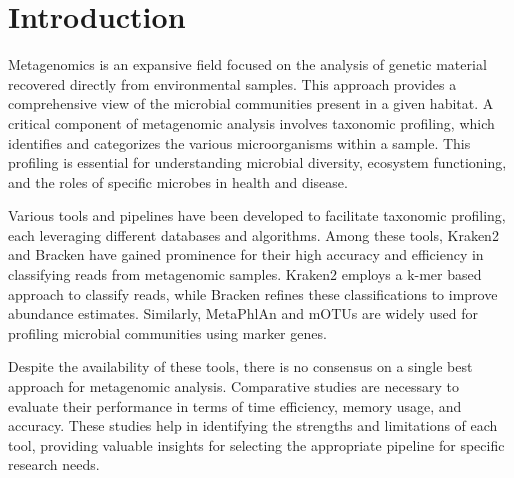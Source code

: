 \chapter{Introduction}\label{chap:Introduction}

Metagenomics is an expansive field focused on the analysis of genetic material recovered directly from environmental samples. 
This approach provides a comprehensive view of the microbial communities present in a given habitat.
A critical component of metagenomic analysis involves taxonomic profiling, which identifies and categorizes the various microorganisms within a sample. 
This profiling is essential for understanding microbial diversity, ecosystem functioning, and the roles of specific microbes in health and disease.

Various tools and pipelines have been developed to facilitate taxonomic profiling, each leveraging different databases and algorithms.
Among these tools, Kraken2 and Bracken have gained prominence for their high accuracy and efficiency in classifying reads from metagenomic samples.
Kraken2 employs a k-mer based approach to classify reads, while Bracken refines these classifications to improve abundance estimates. 
Similarly, MetaPhlAn and mOTUs are widely used for profiling microbial communities using marker genes.

Despite the availability of these tools, there is no consensus on a single best approach for metagenomic analysis. 
Comparative studies are necessary to evaluate their performance in terms of time efficiency, memory usage, and accuracy. 
These studies help in identifying the strengths and limitations of each tool, providing valuable insights for selecting the appropriate pipeline for specific research needs.





\newpage
